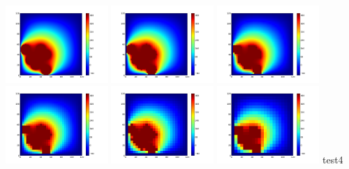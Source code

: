 \documentclass[spanish,a4paper]{article}
\begin{document}
\includegraphics[width=110pt]{Parabrisas3-1.png} \includegraphics[width=110pt]{Parabrisas3-2.png} \includegraphics[width=110pt]{Parabrisas3-3.png} \newline \includegraphics[width=110pt]{Parabrisas3-4.png} \includegraphics[width=110pt]{Parabrisas3-5.png} \includegraphics[width=110pt]{Parabrisas3-6.png} \newline
test4 \newline
\end{document}
